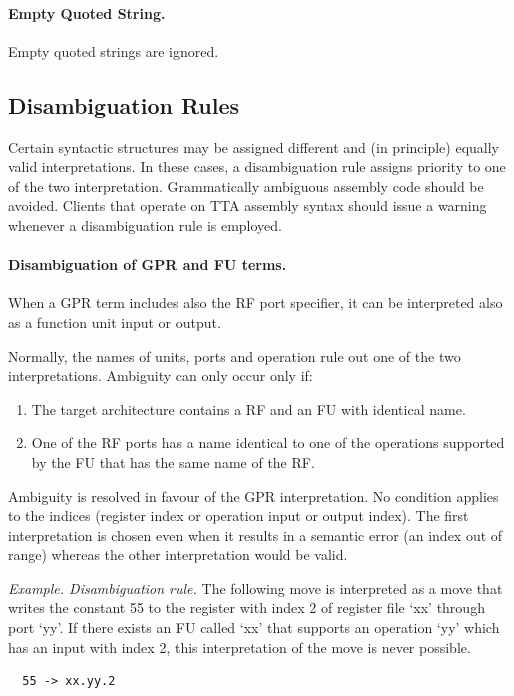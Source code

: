 \documentclass[a4paper,twoside]{tceusermanual}
\begin{document}
\paragraph{Empty Quoted String.}
Empty quoted strings are ignored.

\subsection{Disambiguation Rules}

Certain syntactic structures may be assigned different and (in principle)
equally valid interpretations. In these cases, a disambiguation rule assigns
priority to one of the two interpretation.
%
Grammatically ambiguous assembly code should be avoided.  Clients that
operate on TTA assembly syntax should issue a warning whenever a
disambiguation rule is employed.

\paragraph{Disambiguation of GPR and FU terms.}
When a GPR term includes also the RF port specifier, it can be interpreted
also as a function unit input or output.

Normally, the names of units, ports and operation rule out one of the two
interpretations.  Ambiguity can only occur only if:
\begin{enumerate}
\item%
  The target architecture contains a RF and an FU with identical name.
\item%
  One of the RF ports has a name identical to one of the operations
  supported by the FU that has the same name of the RF.
%
\end{enumerate}

Ambiguity is resolved in favour of the GPR interpretation. No condition
applies to the indices (register index or operation input or output index).
The first interpretation is chosen even when it results in a semantic error
(an index out of range) whereas the other interpretation would be valid.

\emph{Example. Disambiguation rule.} The following move is interpreted as a
move that writes the constant 55 to the register with index 2 of
register file `xx' through port `yy'.  If there exists an FU called `xx'
that supports an operation `yy' which has an input with index 2, this
interpretation of the move is never possible.
\begin{verbatim}
  55 -> xx.yy.2
\end{verbatim}
\end{document}
